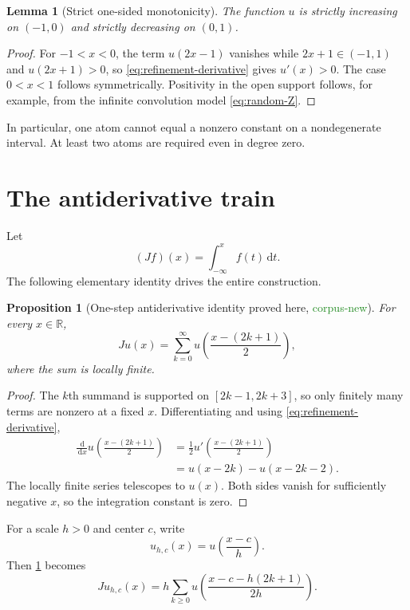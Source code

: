 \documentclass[11pt]{article}
\newtheorem{proposition}[theorem]{Proposition}
\newtheorem{lemma}[theorem]{Lemma}
\theoremstyle{definition}
\theoremstyle{remark}
\newcommand{\R}{\mathbb{R}}
\newcommand{\1}{\mathbf{1}}
\newcommand{\dd}{\,\mathrm{d}}
\newcommand{\CorpusNew}{\textcolor{ForestGreen}{\textsf{corpus-new}}}
\newcommand{\ProvedHere}{\textcolor{BrickRed}{\textsf{proved here}}}
\begin{document}
\begin{lemma}[Strict one-sided monotonicity]
The function $u$ is strictly increasing on $(-1,0)$ and strictly decreasing on
$(0,1)$.
\end{lemma}

\begin{proof}
For $-1<x<0$, the term $u(2x-1)$ vanishes while $2x+1\in(-1,1)$ and
$u(2x+1)>0$, so \eqref{eq:refinement-derivative} gives $u'(x)>0$.  The case
$0<x<1$ follows symmetrically.  Positivity in the open support follows, for
example, from the infinite convolution model \eqref{eq:random-Z}.
\end{proof}

In particular, one atom cannot equal a nonzero constant on a nondegenerate
interval.  At least two atoms are required even in degree zero.

\section{The antiderivative train}

Let
\begin{equation}
 (Jf)(x)=\int_{-\infty}^{x}f(t)\dd t.
 \label{eq:J}
\end{equation}
The following elementary identity drives the entire construction.

\begin{proposition}[One-step antiderivative identity \ProvedHere, \CorpusNew]
\label{prop:one-step}
For every $x\in\R$,
\begin{equation}
 Ju(x)=\sum_{k=0}^{\infty}
 u\!\left(\frac{x-(2k+1)}{2}\right),
 \label{eq:one-step}
\end{equation}
where the sum is locally finite.
\end{proposition}

\begin{proof}
The $k$th summand is supported on $[2k-1,2k+3]$, so only finitely many terms
are nonzero at a fixed $x$.  Differentiating and using
\eqref{eq:refinement-derivative},
\begin{align*}
 \frac{\dd}{\dd x}u\!\left(\frac{x-(2k+1)}2\right)
 &=\frac12u'\!\left(\frac{x-(2k+1)}2\right)\\
 &=u(x-2k)-u(x-2k-2).
\end{align*}
The locally finite series telescopes to $u(x)$.  Both sides vanish for
sufficiently negative $x$, so the integration constant is zero.
\end{proof}

For a scale $h>0$ and center $c$, write
\begin{equation}
 u_{h,c}(x)=u\!\left(\frac{x-c}{h}\right).
 \label{eq:scaled-atom}
\end{equation}
Then \cref{prop:one-step} becomes
\begin{equation}
 J u_{h,c}(x)
 =h\sum_{k\geq0}
 u\!\left(\frac{x-c-h(2k+1)}{2h}\right).
 \label{eq:one-step-scaled}
\end{equation}
\end{document}
